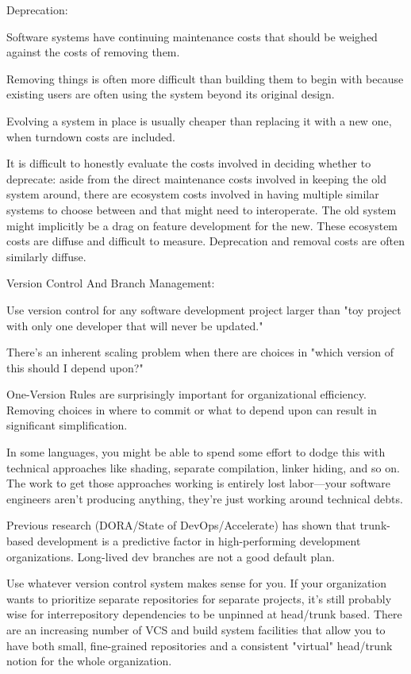 Deprecation:
\bit
\item Software systems have continuing maintenance costs that should be weighed against the costs of removing them.
\item Removing things is often more difficult than building them to begin with because existing users are often using
the system beyond its original design.
\item Evolving a system in place is usually cheaper than replacing it with a new one, when turndown costs are included.
\item It is difficult to honestly evaluate the costs involved in deciding whether to deprecate: aside from the direct
maintenance costs involved in keeping the old system around, there are ecosystem costs involved in having multiple
similar systems to choose between and that might need to interoperate. The old system might implicitly be a drag on
feature development for the new. These ecosystem costs are diffuse and difficult to measure. Deprecation and removal
costs are often similarly diffuse.
\eit

Version Control And Branch Management:
\bit
\item Use version control for any software development project larger than "toy project with only one developer that
will never be updated."
\item There's an inherent scaling problem when there are choices in "which version of this should I depend upon?"
\item One-Version Rules are surprisingly important for organizational efficiency. Removing choices in where to commit or
what to depend upon can result in significant simplification.
\item In some languages, you might be able to spend some effort to dodge this with technical approaches like shading,
separate compilation, linker hiding, and so on. The work to get those approaches working is entirely lost labor—your
software engineers aren't producing anything, they're just working around technical debts.
\item Previous research (DORA/State of DevOps/Accelerate) has shown that trunk-based development is a predictive factor
in high-performing development organizations. Long-lived dev branches are not a good default plan.
\item Use whatever version control system makes sense for you. If your organization wants to prioritize separate
repositories for separate projects, it's still probably wise for interrepository dependencies to be unpinned at
head/trunk based. There are an increasing number of VCS and build system facilities that allow you to have both small,
fine-grained repositories and a consistent "virtual" head/trunk notion for the whole organization.
\eit

